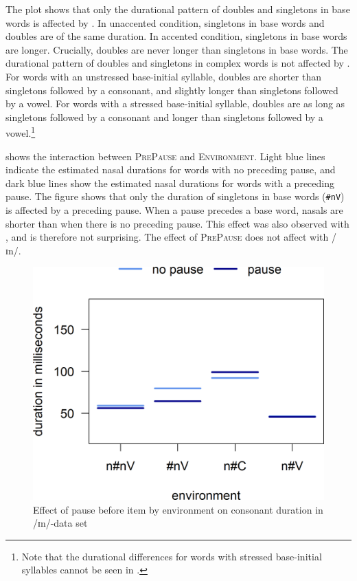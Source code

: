 \largerpage[2] The plot shows that only the durational pattern of doubles and singletons in base words is affected by . 
In unaccented condition, singletons in base words and doubles are of the same duration. In accented condition, singletons in base words are longer. Crucially, doubles are never longer than singletons in base words.
The durational pattern of doubles and singletons in complex words is not affected by . For words with an unstressed base-initial syllable, doubles are shorter than singletons followed by a consonant, and slightly longer than singletons followed by a vowel. For words with a stressed base-initial syllable, doubles are as long as singletons followed by a consonant and longer than singletons followed by a vowel.\footnote{Note that the durational differences for words with stressed base-initial syllables cannot be seen in .} 



 shows the interaction between \textsc{PrePause} and \textsc{Environment}. Light blue lines indicate the estimated nasal durations for words with no preceding pause, and dark blue lines show the estimated nasal durations for words with a preceding pause.
The figure shows that only the duration of singletons in base words (\texttt{\#nV}) is affected by a preceding pause. When a pause precedes a base word, nasals are shorter than when there is no preceding pause. This effect was also observed with , and is therefore not surprising. 
The effect of \textsc{PrePause} does not affect  with /ɪn/.



\begin{figure}
	
	
	
	\includegraphics [scale=0.5] {images/Experiment/InModelCompleteInterEnvPause}
	\caption{Effect of pause before item by environment on consonant duration in /ɪn/-data set}
	\label{fig:Env Pause In complete experiment}
\end{figure}	





